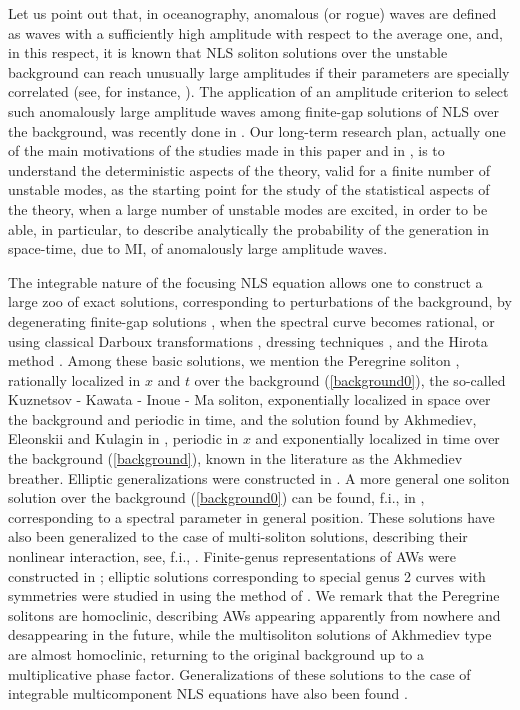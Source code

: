 \documentclass[12pt]{article}
\begin{document}
Let us point out that, in oceanography, anomalous (or rogue) waves are defined as waves with a sufficiently high amplitude with respect to the average one, and, in this respect, it is known that NLS soliton solutions over the unstable background can reach unusually large amplitudes if their parameters are specially correlated (see, for instance, \cite{CaliniShober2}).  The application of an amplitude criterion to select such anomalously large amplitude waves among finite-gap solutions of NLS over the background, was recently done in \cite{BET}. Our long-term research plan, actually one of the main motivations of the studies made in this paper and in \cite{GS1,GS2,GS3,GS4}, is to understand the deterministic aspects of the theory, valid for a finite number of unstable modes, as the starting point for the study of the statistical aspects of the theory, when a large number of unstable modes are excited, in order to be able, in particular, to describe analytically the probability of the generation in space-time, due to MI, of anomalously large amplitude waves.

The integrable nature \cite{ZakharovShabat} of the focusing NLS equation allows one to construct a large zoo of exact solutions, corresponding to perturbations of the background, by degenerating finite-gap solutions \cite{ItsRybinSall,BBEIM,Krichever2,Krichever3}, when the spectral curve becomes rational, or using classical Darboux transformations \cite{Matveev0}, dressing techniques \cite{ZakharovShabatdress,ZakharovManakov,ZakharovMikha}, and the Hirota method \cite{Hirota0,Hirota}. Among these basic solutions, we mention the Peregrine soliton \cite{Peregrine}, rationally localized  in $x$ and $t$ over the background (\ref{background0}), the so-called Kuznetsov \cite{Kuznetsov} - Kawata - Inoue \cite{KI} - Ma \cite{Ma} soliton, exponentially localized in space over the background and periodic in time, and the solution found by Akhmediev, Eleonskii and Kulagin in \cite{Akhmed0}, periodic in $x$ and exponentially localized in time over the background (\ref{background}), known in the literature as the Akhmediev breather. Elliptic generalizations were constructed in  \cite{Akhmed2}. A more general one soliton solution over the background (\ref{background0}) can be found, f.i., in \cite{ItsRybinSall, ZakharovGelash1}, corresponding to a spectral parameter in general position. These solutions have also been generalized to the case of multi-soliton solutions, describing their nonlinear interaction, see, f.i., \cite{ItsRybinSall,DGKMatv,Akhm6,ZakharovGelash2}.  Finite-genus representations of AWs were constructed in \cite{BET}; elliptic solutions corresponding to special genus 2 curves with symmetries were studied in \cite{Smirnov1} using the method of \cite{BBM}.  We remark that the Peregrine solitons are homoclinic, describing AWs appearing apparently from nowhere and desappearing in the future, while the multisoliton solutions of Akhmediev type are almost homoclinic, returning to the original background up to a multiplicative phase factor. Generalizations of these solutions to the case of integrable multicomponent NLS equations have also been found \cite{BDegaCW,DegaLomb,DegaLombSommacal}. 
\end{document}
